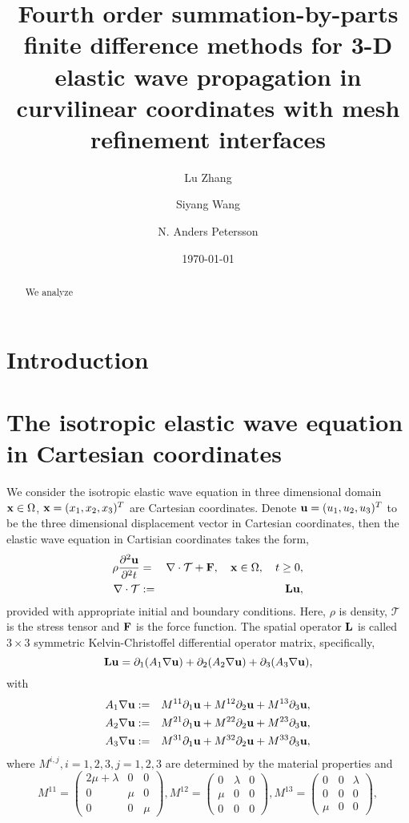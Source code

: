 \documentclass[a4paper]{article}
\title{Fourth order summation-by-parts finite difference methods for  3-D elastic wave propagation in curvilinear coordinates with mesh refinement interfaces}
\date{\today}
\author{ Lu Zhang \and Siyang Wang \and N. Anders Petersson}
\begin{document}
\maketitle

\begin{abstract}
We analyze
\end{abstract}

\section{Introduction}

\section{The isotropic elastic wave equation in Cartesian coordinates}
We consider the isotropic elastic wave equation in three dimensional domain ${\bf x} \in \Omega$, ${\bf x} = (x_1,x_2,x_3)^T$ are Cartesian coordinates. Denote ${\bf u} = (u_1,u_2,u_3)^T$ to be the three dimensional displacement vector in Cartesian coordinates, then the elastic wave equation in Cartisian coordinates takes the form,
\begin{eqnarray*}
    \rho\frac{\partial^2{\bf u}}{\partial^2 t} &=& \nabla\cdot\mathcal{T} + {\bf F}, \ \ \ {\bf x}\in\Omega,\ \ \ t\geq 0,\\
    \nabla\cdot\mathcal{T} &:=& {\bf Lu},
\end{eqnarray*}
provided with appropriate initial and boundary conditions. Here, $\rho$ is density, $\mathcal{T}$ is the stress tensor and ${\bf F}$ is the force function. The spatial operator ${\bf L}$ is called $3\times3$ symmetric Kelvin-Christoffel differential operator matrix, specifically,
\begin{equation*}
    {\bf L u} = \partial_1(A_1\nabla{\bf u}) + \partial_2(A_2\nabla{\bf u}) + \partial_3(A_3\nabla{\bf u}),
\end{equation*}
with
\begin{eqnarray*}
A_1\nabla{\bf u} &:=& M^{11}\partial_1{\bf u} + M^{12}\partial_2{\bf u} + M^{13}\partial_3{\bf u}, \\
A_2\nabla{\bf u} &:=& M^{21}\partial_1{\bf u} + M^{22}\partial_2{\bf u} + M^{23}\partial_3{\bf u}, \\
A_3\nabla{\bf u} &:=& M^{31}\partial_1{\bf u} + M^{32}\partial_2{\bf u} + M^{33}\partial_3{\bf u},
\end{eqnarray*}
where $M^{i,j}, i = 1,2,3, j = 1,2,3$ are determined by the material properties and
\[ M^{11} = \left(\begin{array}{ccc}
2\mu+\lambda & 0 & 0\\
0 & \mu & 0\\
0 & 0 & \mu\end{array}\right), M^{12} = \left(\begin{array}{ccc}
0 & \lambda & 0\\
\mu & 0 & 0\\
0 & 0 & 0\end{array}\right), M^{13} = \left(\begin{array}{ccc}
0 & 0 & \lambda\\
0 & 0 & 0\\
\mu & 0 & 0\end{array}\right),\]
\end{document}
